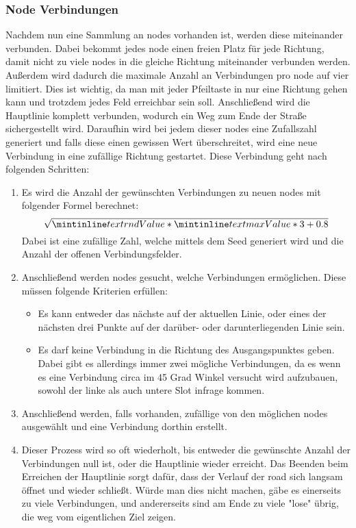 \subsubsection{Node Verbindungen}\label{subsubsec:node-verbindungen}
Nachdem nun eine Sammlung an nodes vorhanden ist, werden diese miteinander verbunden.
Dabei bekommt jedes node einen freien Platz für jede Richtung, damit nicht zu viele nodes in die gleiche Richtung miteinander verbunden werden.
Außerdem wird dadurch die maximale Anzahl an Verbindungen pro node auf vier limitiert.
Dies ist wichtig, da man mit jeder Pfeiltaste in nur eine Richtung gehen kann und trotzdem jedes Feld erreichbar sein soll.
Anschließend wird die Hauptlinie komplett verbunden, wodurch ein Weg zum Ende der Straße sichergestellt wird.
Daraufhin wird bei jedem dieser nodes eine Zufallszahl generiert und falls diese einen gewissen Wert überschreitet, wird eine neue Verbindung in eine zufällige Richtung gestartet.
Diese Verbindung geht nach folgenden Schritten:
\begin{enumerate}
    \item Es wird die Anzahl der gewünschten Verbindungen zu neuen nodes mit folgender Formel berechnet: \[ \sqrt{\inlineCode{rndValue} * \inlineCode{maxValue} * 3 + 0.8}\]
        Dabei ist  eine zufällige Zahl, welche mittels dem Seed generiert wird und  die Anzahl der offenen Verbindungsfelder.
    \item Anschließend werden nodes gesucht, welche Verbindungen ermöglichen.
    Diese müssen folgende Kriterien erfüllen:
    \begin{itemize}
        \item Es kann entweder das nächste auf der aktuellen Linie, oder eines der nächsten drei Punkte auf der darüber- oder darunterliegenden Linie sein.
        \item Es darf keine Verbindung in die Richtung des Ausgangspunktes geben.
        Dabei gibt es allerdings immer zwei mögliche Verbindungen, da es \zB wenn es eine Verbindung circa im 45 Grad Winkel versucht wird aufzubauen, sowohl der linke als auch untere Slot infrage kommen.
    \end{itemize}
    \item Anschließend werden, falls vorhanden, zufällige von den möglichen nodes ausgewählt und eine Verbindung dorthin erstellt.
    \item Dieser Prozess wird so oft wiederholt, bis entweder die gewünschte Anzahl der Verbindungen null ist, oder die Hauptlinie wieder erreicht.
    Das Beenden beim Erreichen der Hauptlinie sorgt dafür, dass der Verlauf der road sich langsam öffnet und wieder schließt.
    Würde man dies nicht machen, gäbe es einerseits zu viele Verbindungen, und andererseits sind am Ende zu viele "lose" übrig, die weg vom eigentlichen Ziel zeigen.
\end{enumerate}

